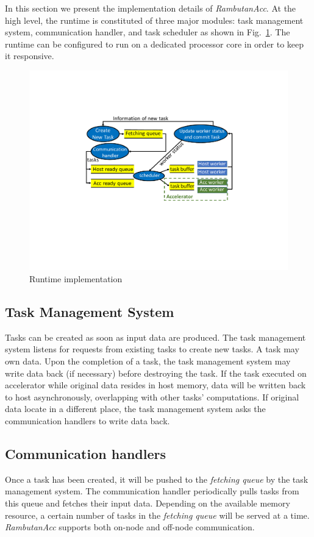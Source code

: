In this section we present the implementation details of {\em RambutanAcc}.
At the high level, the runtime is constituted of three major modules: task management system, communication handler, and task scheduler as shown in Fig.~\ref{fig:impl}. 
The runtime can be configured to run on a dedicated processor core in order to keep it responsive.

\begin{figure}[htb]
\centering
\includegraphics[width=.49\textwidth]{figures/impl.pdf}
\caption{Runtime implementation}
\label{fig:impl}
\end{figure}

\subsection{Task Management System}
Tasks can be created as soon as input data are produced.
The task management system listens for requests from existing tasks to create new tasks.
A task may own data.
Upon the completion of a task, the task management system may write data back (if necessary) before destroying the task.
If the task executed on accelerator while original data resides in host memory, data will be written back to host asynchronously, overlapping with other tasks' computations.
If original data locate in a different place, the task management system asks the communication handlers to write data back.

\subsection{Communication handlers}
Once a task has been created, it will be pushed to the {\em fetching queue} by the task management system.
The communication handler periodically pulls tasks from this queue and fetches their input data.
Depending on the available memory resource, a certain number of tasks in the {\em fetching queue} will be served at a time.
{\em RambutanAcc} supports both on-node and off-node communication.

